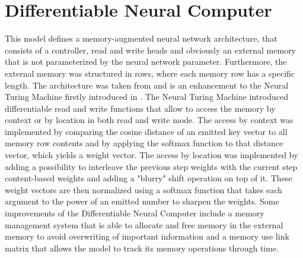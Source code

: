 \documentclass[draft,final]{vutinfth} %
\begin{document}
    \section{Differentiable Neural Computer} \label{Differentiable Neural Computer}
    This model defines a memory-augmented neural network architecture, that consists of a controller, read and write heads and obviously an external memory that is not parameterized by the neural network parameter.
    Furthermore, the external memory was structured in rows, where each memory row has a specific length.
    The architecture was taken from \cite{DNC} and is an enhancement to the Neural Turing Machine firstly introduced in \cite{NTM}.
    The Neural Turing Machine introduced differentiable read and write functions that allow to access the memory by context or by location in both read and write mode.
    The access by context was implemented by comparing the cosine distance of an emitted key vector to all memory row contents and by applying the softmax function to that distance vector, which yields a weight vector.
    The access by location was implemented by adding a possibility to interleave the previous step weights with the current step content-based weights and adding a "blurry" shift operation on top of it.
    These weight vectors are then normalized using a softmax function that takes each argument to the power of an emitted number to sharpen the weights.
    Some improvements of the Differentiable Neural Computer include a memory management system that is able to allocate and free memory in the external memory to avoid overwriting of important information and a memory use link matrix that allows the model to track its memory operations through time.
\end{document}
